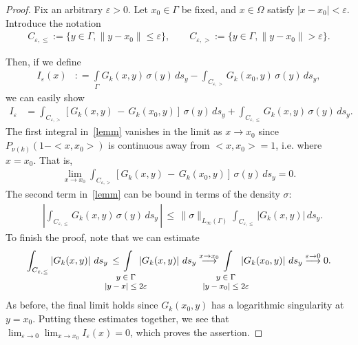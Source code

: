 \documentclass[final]{siamltex}
\newcommand{\e}{\varepsilon}
\begin{document}
\begin{proof}
Fix an arbitrary $\varepsilon > 0$. Let $x_0 \in \Gamma$ be fixed, and
$x \in \Omega$ satisfy $|x-x_0| < \varepsilon$.  Introduce the notation 
\begin{align*}
  C_{\e,\leq}:=\{y \in \Gamma,\|y-x_0\|\leq\e\},\qquad  
  C_{\e,>}:=\{y\in \Gamma,\|y-x_0\|>\e\}.
\end{align*}

Then, if we define
\begin{align*}
I_{\varepsilon}(x) &: = \int\limits_\Gamma G_k(x,y)\,\sigma(y) \,ds_{y} 
 - \int_{C_{\e,>}} G_k(x_0,y)\,\sigma(y)\,ds_{y},
 \end{align*} 
we can easily show
\begin{align}
  I_{\varepsilon}& =  \int_{C_{\e,>}}
  \left[ G_k(x,y)\,-\, G_k(x_0,y) \right]\,\sigma(y)\,ds_{y} +    
    \int_{C_{\e,\leq}} G_k(x,y)\, \sigma(y)\, ds_{y}.
  \label{lemm}
\end{align}
The first integral in~\eqref{lemm} vanishes in the limit as
$x\rightarrow x_0$ since $P_{\nu(k)}(1-<x,x_0>)$ is continuous
away from $<x,x_0>=1$, i.e. where $x=x_0$.  That is, 
\begin{align*}
\lim\limits_{x \to x_0}
\int_{C_{\e,>}}
\left[G_k(x,y)\,-\,G_k(x_0,y) \right]\,\sigma(y)\,ds_{y} = 0 .
\end{align*}
The second term in~\eqref{lemm} can be bound in terms of the density
$\sigma$:
\begin{align*}
 &\left|\int_{C_{\e,\leq}}
G_k(x,y)\,\sigma(y)\,ds_{y}\,\right| \, \leq \,
\| \sigma \|_{L_\infty(\Gamma)} \int_{C_{\e,\leq}}
\left| G_k(x,y)\right|\,ds_{y}.
\end{align*}
To finish the proof, note that we can estimate
\begin{align*} \int_{C_{\e,\leq}}
\left| G_k(x,y)\right|\,ds_{y}\,\leq\,
\hspace*{-8mm} \int\limits_{\footnotesize
\begin{array}{c}y \in \Gamma \\ |y-x| \leq 2\varepsilon\end{array}} \hspace*{-6mm}
\left| G_k(x,y)\right|\,ds_{y}
\buildrel {x\rightarrow x_{0}}\over\longrightarrow 
\hspace*{-8mm} \int\limits_{\footnotesize
\begin{array}{c}y \in \Gamma \\|y-x_0| \leq 2\varepsilon\end{array}} \hspace*{-6mm}
\left| G_k(x_0,y)\right|\,ds_{y}
\buildrel{\varepsilon\rightarrow 0}\over\longrightarrow 0.
\end{align*}
As before, the final limit holds since $G_{k}(x_{0},y)$ has a
logarithmic singularity at $y = x_{0}$.  Putting these estimates
together, we see that  $\displaystyle \lim_{\varepsilon\rightarrow
0}\lim_{x\rightarrow x_{0}} I_{\varepsilon}(x)=0$, which proves the
assertion.
\end{proof}
\end{document}
